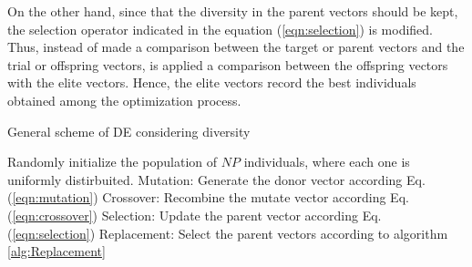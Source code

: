 On the other hand, since that the diversity in the parent vectors should be kept, the selection operator indicated in the equation (\ref{eqn:selection}) is modified.
%
Thus, instead of made a comparison between the target or parent vectors and the trial or offspring vectors, is applied a comparison between the offspring vectors with the elite vectors.
%
Hence, the elite vectors record the best individuals obtained among the optimization process.
%


\begin{algorithm}[H]
  \scriptsize
	\caption{General scheme of DE considering diversity} 
	\begin{algorithmic}[1]
	\STATE Randomly initialize the population of $NP$ individuals, where each one is uniformly distirbuited.
		\STATE Mutation: Generate the donor vector according Eq. (\ref{eqn:mutation})
		\STATE Crossover: Recombine the mutate vector according Eq. (\ref{eqn:crossover})
		\STATE Selection: Update the parent vector according  Eq. (\ref{eqn:selection})
		\STATE Replacement: Select the parent vectors according to algorithm \ref{alg:Replacement}
	   \ENDFOR
	\ENDWHILE
    \label{alg:Fase_Remplazo_VSD-MOEAD}
\end{algorithmic}
\end{algorithm}







